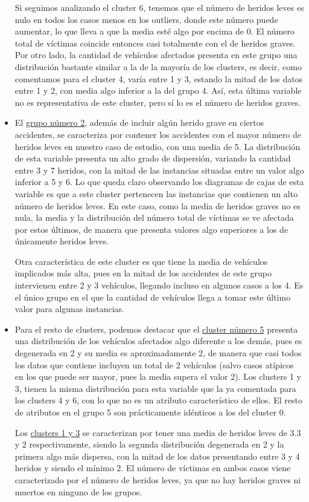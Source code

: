 \documentclass[a4paper,11pt]{book}
\begin{document}
\begin{itemize}
	Si seguimos analizando el cluster 6, tenemos que el número de heridos leves es nulo en todos los casos menos en los outliers, donde este número puede aumentar, lo que lleva a que la media esté algo por encima de 0. El número total de víctimas coincide entonces casi totalmente con el de heridos graves. Por otro lado, la cantidad de vehículos afectados presenta en este grupo una distribución bastante similar a la de la mayoría de los clusters, es decir, como comentamos para el cluster 4, varía entre 1 y 3, estando la mitad de los datos entre 1 y 2, con media algo inferior a la del grupo 4. Así, esta última variable no es representativa de este cluster, pero sí lo es el número de heridos graves. 
	
	\item El \underline{grupo número 2}, además de incluir algún herido grave en ciertos accidentes, se caracteriza por contener los accidentes con el mayor número de heridos leves en nuestro caso de estudio, con una media de 5. La distribución de esta variable presenta un alto grado de dispersión, variando la cantidad entre 3 y 7 heridos, con la mitad de las instancias situadas entre un valor algo inferior a 5 y 6. Lo que queda claro observando los diagramas de cajas de esta variable es que a este cluster pertenecen las instancias que contienen un alto número de heridos leves. En este caso, como la media de heridos graves no es nula, la media y la distribución del número total de víctimas se ve afectada por estos últimos, de manera que presenta valores algo superiores a los de únicamente heridos leves. 
	
	Otra característica de este cluster es que tiene la media de vehículos implicados más alta, pues en la mitad de los accidentes de este grupo intervienen entre 2 y 3 vehículos, llegando incluso en algunos casos a los 4. Es el único grupo en el que la cantidad de vehículos llega a tomar este último valor para algunas instancias. 
	
	\item Para el resto de clusters, podemos destacar que el \underline{cluster número 5} presenta una distribución de los vehículos afectados algo diferente a los demás, pues es degenerada en 2 y su media es aproximadamente 2, de manera que casi todos los datos que contiene incluyen un total de 2 vehículos  (salvo casos atípicos en los que puede ser mayor, pues la media supera el valor 2). Los clusters 1 y 3, tienen la misma distribución para esta variable que la ya comentada para los clusters 4 y 6, con lo que no es un atributo característico de ellos. El resto de atributos en el grupo 5 son prácticamente idénticos a los del cluster 0.
	
	Los \underline{clusters 1 y 3} se caracterizan por tener una media de heridos leves de 3.3 y 2 respectivamente, siendo la segunda distribución degenerada en 2 y la primera algo más dispersa, con la mitad de los datos presentando entre 3 y 4 heridos y siendo el mínimo 2. El número de víctimas en ambos casos viene caracterizado por el número de heridos leves, ya que no hay heridos graves ni muertos en ninguno de los grupos. 
\end{itemize}
\end{document}
